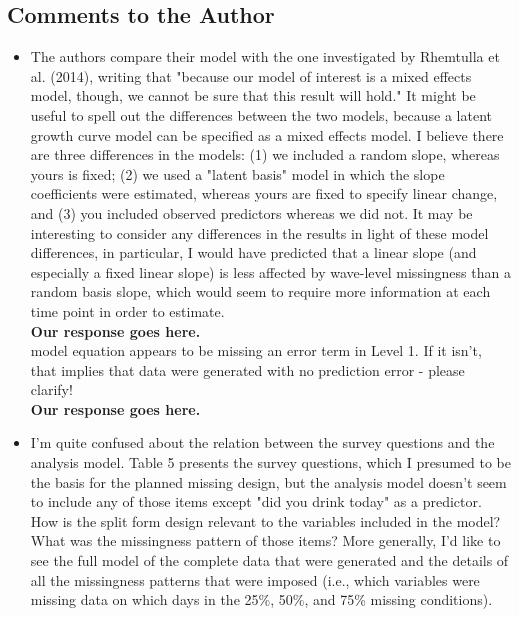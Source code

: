 \documentclass[letterpaper,12pt]{article}\usepackage[]{graphicx}\usepackage[]{color}
\begin{document}
\subsection{Comments to the Author}
\begin{itemize}

\item  The authors compare their model with the one investigated by Rhemtulla et al. (2014), writing that "because our model of interest is a mixed effects model, though, we cannot be sure that this result will hold." It might be useful to spell out the differences between the two models, because a latent growth curve model can be specified as a mixed effects model. I believe there are three differences in the models: (1) we included a random slope, whereas yours is fixed; (2) we used a "latent basis" model in which the slope coefficients were estimated, whereas yours are fixed to specify linear change, and (3) you included observed predictors whereas we did not. It may be interesting to consider any differences in the results in light of these model differences, in particular, I would have predicted that a linear slope (and especially a fixed linear slope) is less affected by wave-level missingness than a random basis slope, which would seem to require more information at each time point in order to estimate.\\

{\bf Our response goes here.}\\

\itemThe model equation appears to be missing an error term in Level 1. If it isn't, that implies that data were generated with no prediction error - please clarify!\\

{\bf Our response goes here.}\\

\item I'm quite confused about the relation between the survey questions and the analysis model. Table 5 presents the survey questions, which I presumed to be the basis for the planned missing design, but the analysis model doesn't seem to include any of those items except "did you drink today" as a predictor. How is the split form design relevant to the variables included in the model? What was the missingness pattern of those items? More generally, I'd like to see the full model of the complete data that were generated and the details of all the missingness patterns that were imposed (i.e., which variables were missing data on which days in the 25\%, 50\%, and 75\% missing conditions).\\


\end{itemize}
\end{document}
